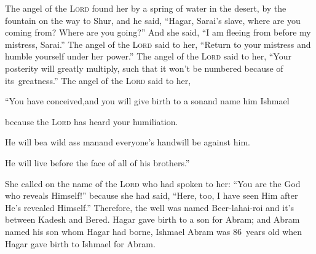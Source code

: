 \begin{inparaenum}
   The angel of the \textsc{Lord} found her by a spring of water in the desert, by the fountain on the way to Shur,%
   and he said, ``Hagar, Sarai's slave, where are you coming from? Where are you going?'' And she said, ``I am fleeing from before my mistress, Sarai.''%
   The angel of the \textsc{Lord} said to her, ``Return to your mistress and humble yourself under her power.'' %
   The angel of the \textsc{Lord} said to her, ``Your posterity will greatly multiply, such that it won't be numbered because of its\understood\ greatness.''%
   The angel of the \textsc{Lord} said to her,%
  
  \pc ``You have conceived,\pa and you will give birth to a son\pa and name him Ishmael%
  
  \pc because the \textsc{Lord} has heard your humiliation.%
  
  \pb {} He will be\pa a wild ass%
  man\pa and everyone's hand\pa will be against him.%
  
  \pc He will live before the face of all of his brothers.''\smallskip%
  
  \noindent{} She called on the name of the \textsc{Lord} who had spoken to her: ``You are the God who reveals Himself!'' because she had said, ``Here, too, I have seen Him after He's revealed Himself.''%
   Therefore, the well was named Beer-lahai-roi and it's between Kadesh and Bered.%
   Hagar gave birth to a son for Abram; and Abram named his son whom Hagar had borne, Ishmael%
   Abram was 86~years old when Hagar gave birth to Ishmael for Abram.%
\end{inparaenum}
